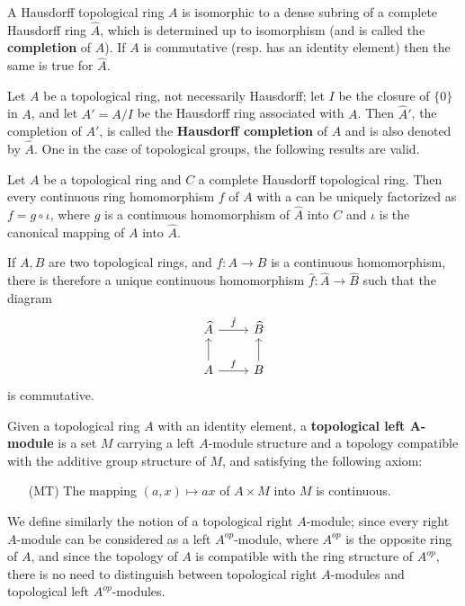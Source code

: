 \begin{proposition}\label{topological ring completion}
A Hausdorff topological ring $A$ is isomorphic to a dense subring of a complete Hausdorff ring $\widehat{A}$, which is determined up to isomorphism (and is called the \textbf{completion} of $A$). If $A$ is commutative (resp. has an identity element) then the same is true for $\widehat{A}$.
\end{proposition}
Let $A$ be a topological ring, not necessarily Hausdorff; let $I$ be the closure of $\{0\}$ in $A$, and let $A'=A/I$ be the Hausdorff ring associated with $A$. Then $\widehat{A}'$, the completion of $A'$, is called the \textbf{Hausdorff completion} of $A$ and is also denoted by $\widehat{A}$. One in the case of topological groups, the following results are valid.
\begin{proposition}
Let $A$ be a topological ring and $C$ a complete Hausdorff topological ring. Then every continuous ring homomorphism $f$ of $A$ with a  can be uniquely factorized as $f=g\circ\iota$, where $g$ is a continuous homomorphism of $\widehat{A}$ into $C$ and $\iota$ is the canonical mapping of $A$ into $\widehat{A}$.
\end{proposition}
\begin{proposition}
If $A,B$ are two topological rings, and $f:A\to B$ is a continuous homomorphism, there is therefore a unique continuous homomorphism $\hat{f}:\widehat{A}\to\widehat{B}$ such that the diagram
\[\begin{tikzcd}
\widehat{A}\ar[r,"\hat{f}"]&\widehat{B}\\
A\ar[u]\ar[r,"f"]&B\ar[u]
\end{tikzcd}\]
is commutative.
\end{proposition}
\begin{definition}
Given a topological ring $A$ with an identity element, a \textbf{topological left $\bm{A}$-module} is a set $M$ carrying a left $A$-module structure and a topology compatible with the additive group structure of $M$, and satisfying the following axiom:
\begin{enumerate}[leftmargin=40pt]
\item[(MT)] The mapping $(a,x)\mapsto ax$ of $A\times M$ into $M$ is continuous.
\end{enumerate}
\end{definition}
We define similarly the notion of a topological right $A$-module; since every right $A$-module can be considered as a left $A^{op}$-module, where $A^{op}$ is the opposite ring of $A$, and since the topology of $A$ is compatible with the ring structure of $A^{op}$, there is no need to distinguish between topological right $A$-modules and topological left $A^{op}$-modules.
